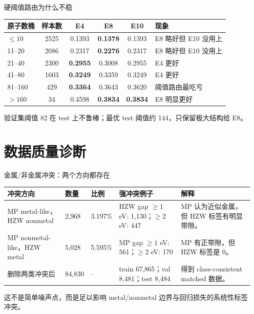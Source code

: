 \documentclass[aspectratio=169]{beamer}
\begin{document}
\begin{frame}{硬阈值路由为什么不稳}
\scriptsize
\centering
\setlength{\tabcolsep}{4pt}
\begin{tabular}{l c c c c l}
\toprule
原子数桶 & 样本数 & E4 & E8 & E10 & 现象 \\
\midrule
$\le10$ & 2525 & 0.1393 & \textbf{0.1378} & 0.1393 & E8 略好但 E10 没用上 \\
11--20 & 2086 & 0.2317 & \textbf{0.2276} & 0.2317 & E8 略好但 E10 没用上 \\
21--40 & 2300 & \textbf{0.2955} & 0.3008 & 0.2955 & E4 更好 \\
41--80 & 1603 & \textbf{0.3249} & 0.3359 & 0.3249 & E4 更好 \\
81--160 & 429 & \textbf{0.3364} & 0.3643 & 0.3620 & 阈值路由最吃亏 \\
$>160$ & 34 & 0.4598 & \textbf{0.3834} & \textbf{0.3834} & E8 明显更好 \\
\bottomrule
\end{tabular}

\vspace{2mm}
\small
验证集阈值 82 在 test 上不鲁棒；最优 test 阈值约 144，只保留极大结构给 E8。
\end{frame}

\section{数据质量诊断}

\begin{frame}{金属/非金属冲突：两个方向都存在}
\scriptsize
\centering
\setlength{\tabcolsep}{4pt}
\begin{tabularx}{\textwidth}{p{2.4cm} p{1.3cm} p{1.2cm} p{3.2cm} Y}
\toprule
冲突方向 & 数量 & 比例 & 强冲突例子 & 解释 \\
\midrule
MP metal-like，HZW nonmetal & 2,968 & 3.197\% & HZW gap $\ge 1$ eV: 1,130；$\ge 2$ eV: 447 & MP 认为近似金属，但 HZW 标签有明显带隙。 \\
MP nonmetal-like，HZW metal & 5,028 & 5.595\% & MP gap $\ge 1$ eV: 561；$\ge 2$ eV: 170 & MP 有正带隙，但 HZW 标签是 0。 \\
删除两类冲突后 & 84,830 & -- & train 67,865；val 8,481；test 8,484 & 得到 class-consistent matched 数据。 \\
\bottomrule
\end{tabularx}

\vspace{2mm}
\small
这不是简单噪声点，而是足以影响 metal/nonmetal 边界与回归损失的系统性标签冲突。
\end{frame}
\end{document}
